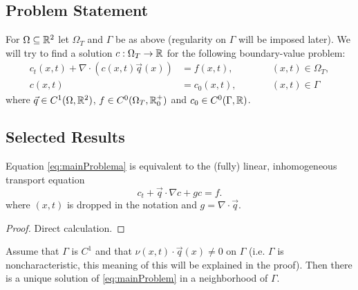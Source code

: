 \documentclass[paper=a4, fontsize=12pt,parskip=half,draft,headings=small]{scrartcl}
\newcommand{\q}{\vec{q}}
\begin{document}
	\subsection{Problem Statement}
			For $\Omega \subseteq \mathbb{R}^2$ let $\Omega_T$ and $\Gamma$ be as above (regularity on $\Gamma$ will be imposed later).
			We will try to find a solution $c: \Omega_T \to \mathbb{R}$ for the following boundary-value problem:
			\begin{subequations}
				\label{eq:mainProblem}
				\begin{alignat}{2}
					c_t(x,t) + \nabla \cdot \left(c(x,t)\q(x) \right) &= f(x,t), &\qquad  &(x,t) \in \Omega_T, \label{eq:mainProblema} \\
					c(x,t) &= c_0(x,t), && (x,t) \in \Gamma \label{eq:mainProblemb}
				\end{alignat}
			\end{subequations}
			where $\q \in C^1(\Omega,\R^2)$, $f \in C^0(\Omega_T,\mathbb{R}^+_0)$ and $c_0 \in C^0(\Gamma,\mathbb{R})$.
			
	\subsection{Selected Results}
		\begin{lemma}
			Equation \eqref{eq:mainProblema} is equivalent to the (fully) linear, inhomogeneous transport equation
			\begin{equation}\label{eq:transport}
				c_t + \q \cdot \nabla c + g c = f.
			\end{equation}
			where $(x,t)$ is dropped in the notation and $g = \nabla \cdot \q$.
		\end{lemma}
		\begin{proof}
			Direct calculation.
		\end{proof}
	
		\begin{lemma}
			Assume that $\Gamma$ is $C^1$ and that $\nu(x,t) \cdot \q(x) \neq 0$ on $\Gamma$ (i.e. $\Gamma$ is noncharacteristic, this meaning of this will be explained in the proof). Then there is a unique solution of \eqref{eq:mainProblem} in a neighborhood of $\Gamma$.
		\end{lemma}
		
\end{document}
